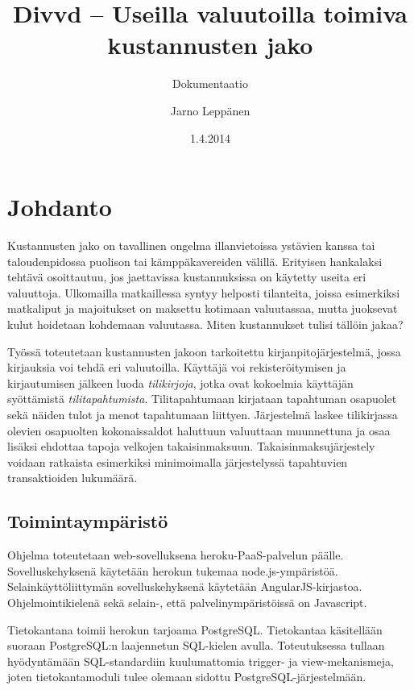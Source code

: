 \documentclass[a4paper,parskip=half]{scrartcl}
\author{Jarno Leppänen}
\title{Divvd -- Useilla valuutoilla toimiva kustannusten jako}
\subtitle{Dokumentaatio}
\date{1.4.2014}
\begin{document}
\maketitle

\tableofcontents

\section{Johdanto}

Kustannusten jako on tavallinen ongelma illanvietoissa ystävien
kanssa tai taloudenpidossa puolison tai kämppäkavereiden välillä. Erityisen
hankalaksi tehtävä osoittautuu, jos jaettavissa kustannuksissa on käytetty
useita eri valuuttoja. Ulkomailla matkaillessa syntyy helposti tilanteita,
joissa esimerkiksi matkaliput ja majoitukset on maksettu kotimaan valuutassaa,
mutta juoksevat kulut hoidetaan kohdemaan valuutassa. Miten kustannukset
tulisi tällöin jakaa?

Työssä toteutetaan kustannusten jakoon tarkoitettu kirjanpitojärjestelmä, jossa
kirjauksia voi tehdä eri valuutoilla. Käyttäjä voi rekisteröitymisen ja
kirjautumisen jälkeen luoda \textit{tilikirjoja}, jotka ovat kokoelmia
käyttäjän syöttämistä \textit{tilitapahtumista}. Tilitapahtumaan kirjataan
tapahtuman osapuolet sekä näiden tulot ja menot tapahtumaan liittyen.
Järjestelmä laskee tilikirjassa olevien osapuolten kokonaissaldot haluttuun
valuuttaan muunnettuna ja osaa lisäksi ehdottaa tapoja velkojen
takaisinmaksuun. Takaisinmaksujärjestely voidaan ratkaista esimerkiksi
minimoimalla järjestelyssä tapahtuvien transaktioiden
lukumäärä\cite{verhoeff2004settling}.

\subsection{Toimintaympäristö}

Ohjelma toteutetaan web-sovelluksena heroku-PaaS-palvelun päälle.
Sovelluskehyksenä käytetään herokun tukemaa node.js-ympäristöä.
Selainkäyttöliittymän sovelluskehyksenä käytetään AngularJS-kirjastoa.
Ohjelmointikielenä sekä selain-, että palvelinympäristöissä on Javascript.

Tietokantana toimii herokun tarjoama PostgreSQL. Tietokantaa käsitellään
suoraan Postgre\-SQL:n laajennetun SQL-kielen avulla. Toteutuksessa tullaan
hyödyntämään SQL-standardiin kuulumattomia trigger- ja view-mekanismeja, joten
tietokantamoduli tulee olemaan sidottu Post\-gre\-SQL-jär\-jes\-tel\-mään.
\end{document}
